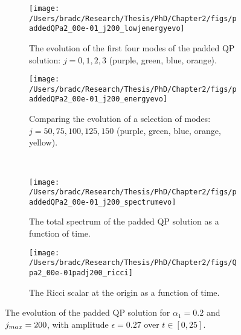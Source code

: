 \documentclass[../PhD.tex]{subfiles}
\begin{document}
\begin{figure}[ht]
	\centering
	\begin{subfigure}[t]{0.45\textwidth}
		\texttt{[image: /Users/bradc/Research/Thesis/PhD/Chapter2/figs/paddedQPa2\_00e-01\_j200\_lowjenergyevo]}
		\caption{The evolution of the first four modes of the padded QP solution: {$j=0,1,2,3$} (purple, green, blue, orange).}
	\end{subfigure}
	\hfill
	\begin{subfigure}[t]{0.45\textwidth}
		\texttt{[image: /Users/bradc/Research/Thesis/PhD/Chapter2/figs/paddedQPa2\_00e-01\_j200\_energyevo]}
		\caption{Comparing the evolution of a selection of modes: {$j= 50, 75, 100, 125, 150$} (purple, green, blue, orange, yellow).}
	\end{subfigure}
	\\
	\begin{subfigure}[t]{0.45\textwidth}
		\texttt{[image: /Users/bradc/Research/Thesis/PhD/Chapter2/figs/paddedQPa2\_00e-01\_j200\_spectrumevo]}
		\caption{The total spectrum of the padded QP solution as a function of time.}
		\label{fig: paddedqp_fullspecevo}
	\end{subfigure}
	\:\:\:
	\begin{subfigure}[t]{0.45\textwidth}
		\texttt{[image: /Users/bradc/Research/Thesis/PhD/Chapter2/figs/Qpa2\_00e-01padj200\_ricci]}
		\caption{The Ricci scalar at the origin as a function of time.}
		\label{fig: Qpa2_00e-01padj200_ricci}
	\end{subfigure}
	\caption[The evolution of a padded QP solution]{The evolution of the padded QP solution for $\alpha_1 =0.2$ and $j_{max} = 200$, with amplitude $\epsilon=0.27$ over $t \in [0, 25]$.}
	\label{fig:paddedqpevo}
\end{figure}

\end{document}
